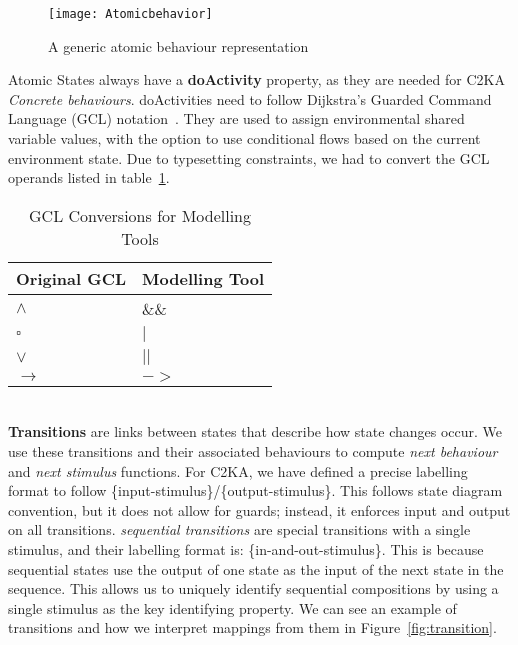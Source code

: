 \begin{figure}[ht]
    \centering
    \texttt{[image: Atomicbehavior]}
    \caption{A generic atomic behaviour representation}
    \label{fig:atomicbehaviour}
\end{figure}

Atomic States always have a \textbf{doActivity} property,
as they are needed for C2KA \textit{Concrete behaviours}.
doActivities need to follow Dijkstra's Guarded Command Language (GCL) notation~\cite{gcl}.
They are used to assign environmental shared variable values,
with the option to use conditional flows based on the current environment state.
Due to typesetting constraints, we had to convert the GCL operands listed in table~\ref{tab:gcl-equivalence}.
\begin{table}[htbp]
    \centering
    \caption{GCL Conversions for Modelling Tools}\label{tab:gcl-equivalence}
    \begin{tabular}{| l | l |}
        \hline
        \textbf{Original GCL} & \textbf{Modelling Tool} \\
        \hline
        $\land$ & \&\& \\ \hline
        $\square$ & $|$ \\ \hline
        $\lor$ & $||$ \\ \hline
        $\rightarrow$ & $->$ \\ \hline
    \end{tabular}
\end{table}
\\

\textbf{Transitions} are links between states that describe how state changes occur.
We use these transitions and their associated behaviours to compute \textit{next behaviour} and \textit{next stimulus} functions.
For C2KA, we have defined a precise labelling format to follow \{input-stimulus\}/\{output-stimulus\}.
This follows state diagram convention, but it does not allow for guards; instead, it enforces input and output on all transitions.
\textit{sequential transitions} are special transitions with a single stimulus, and their labelling format is: \{in-and-out-stimulus\}.
This is because sequential states use the output of one state as the input of the next state in the sequence.
This allows us to uniquely identify sequential compositions by using a single stimulus as the key identifying property.
We can see an example of transitions and how we interpret mappings from them in Figure~\ref{fig:transition}.

